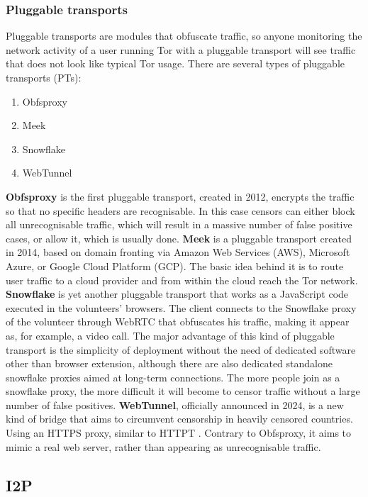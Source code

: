 \subsubsection{Pluggable transports}
Pluggable transports are modules that obfuscate traffic, so anyone monitoring the network activity of a user running Tor with a pluggable transport will see traffic that does not look like typical Tor usage. There are several types of pluggable transports (PTs):
\begin{enumerate}
    \item Obfsproxy
    \item Meek
    \item Snowflake
    \item WebTunnel
\end{enumerate}

\textbf{Obfsproxy} is the first pluggable transport, created in 2012, encrypts the traffic so that no specific headers are recognisable. In this case censors can either block all unrecognisable traffic, which will result in a massive number of false positive cases, or allow it, which is usually done. \textbf{Meek} is a pluggable transport created in 2014, based on domain fronting via Amazon Web Services (AWS), Microsoft Azure, or Google Cloud Platform (GCP). The basic idea behind it is to route user traffic to a cloud provider and from within the cloud reach the Tor network. \textbf{Snowflake} is yet another pluggable transport that works as a JavaScript code executed in the volunteers' browsers. The client connects to the Snowflake proxy of the volunteer through WebRTC that obfuscates his traffic, making it appear as, for example, a video call. The major advantage of this kind of pluggable transport is the simplicity of deployment without the need of dedicated software other than browser extension, although there are also dedicated standalone snowflake proxies aimed at long-term connections. The more people join as a snowflake proxy, the more difficult it will become to censor traffic without a large number of false positives. \textbf{WebTunnel}, officially announced in 2024, is a new kind of bridge that aims to circumvent censorship in heavily censored countries. Using an HTTPS proxy, similar to HTTPT \cite{httpt}. Contrary to Obfsproxy, it aims to mimic a real web server, rather than appearing as unrecognisable traffic.

\subsection{I2P}

